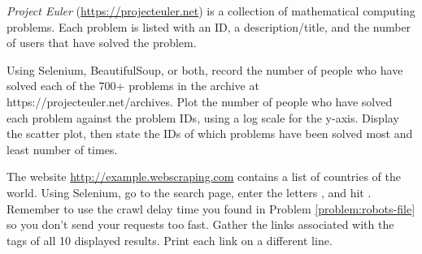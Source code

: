 \begin{problem}
\emph{Project Euler} (\url{https://projecteuler.net}) is a collection of mathematical computing problems.
Each problem is listed with an ID, a description/title, and the number of users that have solved the problem.

Using Selenium, BeautifulSoup, or both, record the number of people who have solved each of the 700+ problems in the archive at https://projecteuler.net/archives.
Plot the number of people who have solved each problem against the problem IDs, using a log scale for the y-axis.
Display the scatter plot, then state the IDs of which problems have been solved most and least number of times.
\end{problem}

\begin{problem} %
The website \url{http://example.webscraping.com} contains a list of countries of the world.
Using Selenium, go to the search page, enter the letters , and hit .
Remember to use the crawl delay time you found in Problem \ref{problem:robots-file} so you don't send your requests too fast.
Gather the  links associated with the  tags of all 10 displayed results.
Print each link on a different line.
\end{problem}